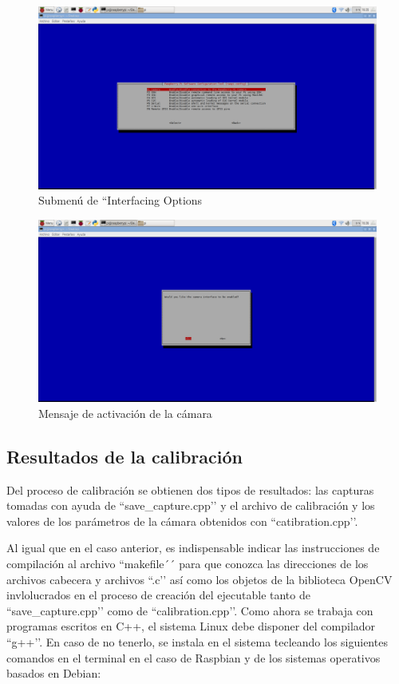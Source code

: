     \begin{figure}
    \centering
    \includegraphics[scale = 0.25]{capitulo_04/figuras_dir/actp2.jpg}
    \caption{Submenú de ``Interfacing Options}
    \end{figure}

    \begin{figure}
    \centering
    \includegraphics[scale = 0.25]{capitulo_04/figuras_dir/actp3.jpg}
    \caption{Mensaje de activación de la cámara}
    \end{figure}


\subsection{Resultados de la calibración} \label{s4_2_3}

Del proceso de calibración se obtienen dos tipos de resultados: las capturas tomadas con ayuda de ``save\_capture.cpp’’ y el archivo de calibración y los valores de los parámetros de la cámara obtenidos con ``catibration.cpp’’.

Al igual que en el caso anterior, es indispensable indicar las instrucciones de compilación al archivo ``makefile´´ para que conozca las direcciones de los archivos cabecera y archivos ``.c’’ así como los objetos de la biblioteca OpenCV invlolucrados en el proceso de creación del ejecutable tanto de ``save\_capture.cpp’’ como de ``calibration.cpp’’. Como ahora se trabaja con programas escritos en C++, el sistema Linux debe disponer del compilador ``g++’’. En caso de no tenerlo, se instala en el sistema tecleando los siguientes comandos en el terminal en el caso de Raspbian y de los sistemas operativos basados en Debian:

